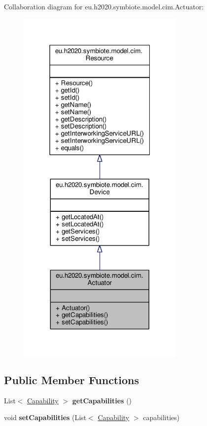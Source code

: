 Collaboration diagram for eu.\+h2020.\+symbiote.\+model.\+cim.\+Actuator\+:
\nopagebreak
\begin{figure}[H]
\begin{center}
\leavevmode
\includegraphics[width=232pt]{classeu_1_1h2020_1_1symbiote_1_1model_1_1cim_1_1Actuator__coll__graph}
\end{center}
\end{figure}
\subsection*{Public Member Functions}
\begin{DoxyCompactItemize}
\item 
\mbox{\label{classeu_1_1h2020_1_1symbiote_1_1model_1_1cim_1_1Actuator_ae11f2ea511931a50467ede9652079a6d}} 
List$<$ \hyperlink{classeu_1_1h2020_1_1symbiote_1_1model_1_1cim_1_1Capability}{Capability} $>$ {\bfseries get\+Capabilities} ()
\item 
\mbox{\label{classeu_1_1h2020_1_1symbiote_1_1model_1_1cim_1_1Actuator_a857f30bb688b4ccea031a9e263ce2157}} 
void {\bfseries set\+Capabilities} (List$<$ \hyperlink{classeu_1_1h2020_1_1symbiote_1_1model_1_1cim_1_1Capability}{Capability} $>$ capabilities)
\end{DoxyCompactItemize}


